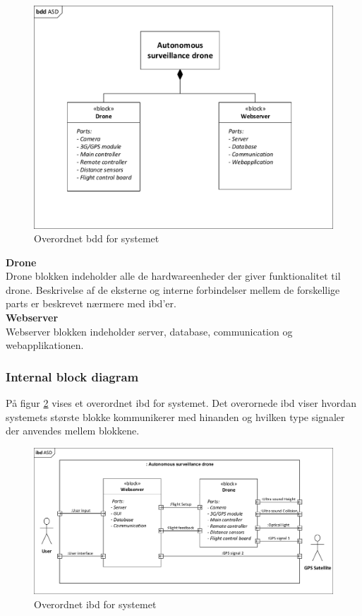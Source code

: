 \begin{figure}[H]
	\centering
	\includegraphics[width=1.0\textwidth]{Billeder/Projektbeskrivelse/bdd_overordnet.pdf}
	\caption{Overordnet bdd for systemet}
	\label{fig:bdd_asd}
\end{figure}

\textbf{Drone} \\
Drone blokken indeholder alle de hardwareenheder der giver funktionalitet til drone. Beskrivelse af de eksterne og interne forbindelser mellem de forskellige parts er beskrevet nærmere med ibd'er. \\

\textbf{Webserver} \\
Webserver blokken indeholder server, database, communication og webapplikationen.

\newpage

\subsubsection*{Internal block diagram}
\vspace{-0.3cm}	

På figur \ref{fig:ibd_asd} vises et overordnet ibd for systemet. Det overornede ibd viser hvordan systemets største blokke kommunikerer med hinanden og hvilken type signaler der anvendes mellem blokkene. 

\begin{figure}[H]
	\centering
	\includegraphics[width=1\textwidth]{Billeder/Projektbeskrivelse/ibd1_overordnet.pdf}
	\caption{Overordnet ibd for systemet}
	\label{fig:ibd_asd}
\end{figure}

